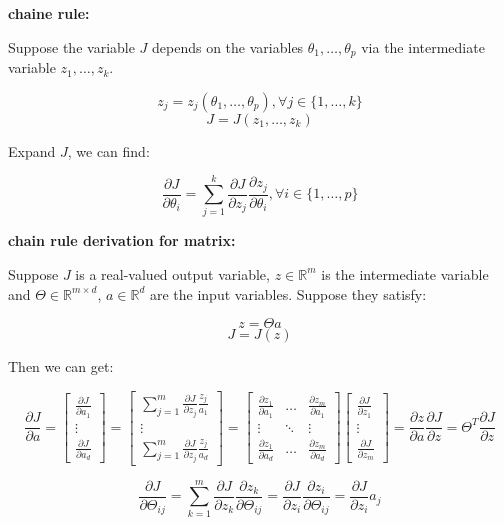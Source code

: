 \documentclass{article}
\begin{document}
\noindent \textbf{chaine rule:}

\noindent Suppose the variable \(J\) depends on the variables \(\theta_1, \dots, \theta_p\) via the intermediate variable \(z_1, \dots, z_k\).

\[z_j = z_j(\theta_1, \dots, \theta_p), \forall j \in \{1, \dots, k\} \]
\[J = J(z_1, \dots, z_k)\]

\noindent Expand \(J\), we can find:

\[\frac{\partial J}{\partial \theta_i} = \sum_{j = 1}^{k} \frac{\partial J}{\partial z_j} \frac{\partial z_j}{\partial \theta_i}, \forall i \in \{1, \dots, p\}\]

\noindent \textbf{chain rule derivation for matrix:}

\noindent Suppose \(J\) is a real-valued output variable, \(z \in \mathbb{R}^m\) is the intermediate variable and \(\Theta \in \mathbb{R}^{m \times d}\), \(a \in \mathbb{R}^d\) are the input variables. Suppose they satisfy:

\[z = \Theta a\]
\[J = J(z)\]

\noindent Then we can get:

\[
\frac{\partial J}{\partial a} = 
\begin{bmatrix}
\frac{\partial J}{\partial a_1}\\
\vdots\\
\frac{\partial J}{\partial a_d}
\end{bmatrix}
= 
\begin{bmatrix}
\sum_{j = 1}^m \frac{\partial J}{\partial z_j} \frac{z_j}{a_1}\\
\vdots\\
\sum_{j = 1}^m \frac{\partial J}{\partial z_j} \frac{z_j}{a_d}
\end{bmatrix}
=
\begin{bmatrix}
\frac{\partial z_1}{\partial a_1} & \dots & \frac{\partial z_m}{\partial a_1}\\
\vdots & \ddots & \vdots\\
\frac{\partial z_1}{\partial a_d} & \dots & \frac{\partial z_m}{\partial a_d}
\end{bmatrix}
\begin{bmatrix}
\frac{\partial J}{\partial z_1}\\
\vdots\\
\frac{\partial J}{\partial z_m}
\end{bmatrix}
= \frac{\partial z}{\partial a} \frac{\partial J}{\partial z}
= \Theta^T \frac{\partial J}{\partial z}
\]

\[
\frac{\partial J}{\partial \Theta_{ij}} = \sum_{k = 1}^m \frac{\partial J}{\partial z_k} \frac{\partial z_k}{\partial \Theta_{ij}} = \frac{\partial J}{\partial z_i} \frac{\partial z_i}{\partial \Theta_{ij}} = \frac{\partial J}{\partial z_i} a_j
\]
\end{document}
